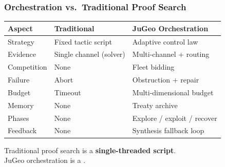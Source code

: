 \begin{frame}
\frametitle{Orchestration vs.\ Traditional Proof Search}
\begin{center}
\small
\begin{tabular}{@{} l l l @{}}
  \toprule
  \textbf{Aspect} & \textbf{Traditional} & \textbf{JuGeo Orchestration} \\
  \midrule
  Strategy    & Fixed tactic script    & Adaptive control law \\
  Evidence    & Single channel (solver) & Multi-channel + routing \\
  Competition & None                   & Fleet bidding \\
  Failure     & Abort                  & Obstruction + repair \\
  Budget      & Timeout                & Multi-dimensional budget \\
  Memory      & None                   & Treaty archive \\
  Phases      & None                   & Explore / exploit / recover \\
  Feedback    & None                   & Synthesis fallback loop \\
  \bottomrule
\end{tabular}
\end{center}
\vfill
\begin{center}
Traditional proof search is a \textbf{single-threaded script}.\\
JuGeo orchestration is a .
\end{center}
\end{frame}

